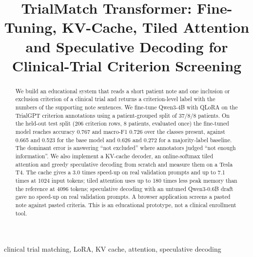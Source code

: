 \documentclass[conference]{IEEEtran}
\begin{document}
\title{TrialMatch Transformer: Fine-Tuning, KV-Cache, Tiled Attention and Speculative Decoding for Clinical-Trial Criterion Screening}

\author{
}

\maketitle

\begin{abstract}
We build an educational system that reads a short patient note and one inclusion or exclusion criterion of a clinical trial and returns a criterion-level label with the numbers of the supporting note sentences. We fine-tune Qwen3-4B with QLoRA on the TrialGPT criterion annotations using a patient-grouped split of 37/8/8 patients. On the held-out test split (206 criterion rows, 8 patients, evaluated once) the fine-tuned model reaches accuracy 0.767 and macro-F1 0.726 over the classes present, against 0.665 and 0.523 for the base model and 0.626 and 0.272 for a majority-label baseline. The dominant error is answering ``not excluded'' where annotators judged ``not enough information''. We also implement a KV-cache decoder, an online-softmax tiled attention and greedy speculative decoding from scratch and measure them on a Tesla T4. The cache gives a 3.0 times speed-up on real validation prompts and up to 7.1 times at 1024 input tokens; tiled attention uses up to 180 times less peak memory than the reference at 4096 tokens; speculative decoding with an untuned Qwen3-0.6B draft gave no speed-up on real validation prompts. A browser application screens a pasted note against pasted criteria. This is an educational prototype, not a clinical enrollment tool.
\end{abstract}

\begin{IEEEkeywords}
clinical trial matching, LoRA, KV cache, attention, speculative decoding
\end{IEEEkeywords}
\end{document}

